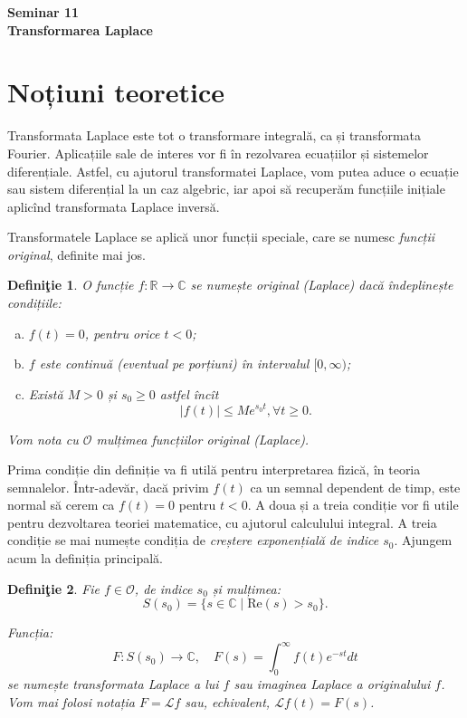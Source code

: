 \documentclass[12pt,a4paper]{article}
\newcommand\kal{\mathcal}
\newcommand\RR{\mathbb{R}}
\newcommand\CC{\mathbb{C}}
\newcommand\Lap{\mathcal{L}}
\theoremstyle{dotless}
\theoremstyle{dotlessdr}
\newtheorem{definition}{Defini\c{t}ie}
\begin{document}

\begin{center}
  {\large\textbf{Seminar 11 \\
      Transformarea Laplace}}
\end{center}

\vspace{2cm}

\section*{Noțiuni teoretice}

\indent\indent Transformata Laplace este tot o transformare integrală, ca și transformata
Fourier. Aplicațiile sale de interes vor fi în rezolvarea ecuațiilor și sistemelor
diferențiale. Astfel, cu ajutorul transformatei Laplace, vom putea aduce o ecuație sau
sistem diferențial la un caz algebric, iar apoi să recuperăm funcțiile inițiale aplicînd
transformata Laplace inversă.

Transformatele Laplace se aplică unor funcții speciale, care se numesc \emph{funcții original},
definite mai jos.

\begin{definition}\label{def:original}
  O funcție $ f : \RR \to \CC $ se numește \emph{original} (Laplace) dacă îndeplinește
  condițiile:
  \begin{enumerate}[(a)]
  \item $ f(t) = 0 $, pentru orice $ t < 0 $;
  \item $ f $ este continuă (eventual pe porțiuni) în intervalul $ [0, \infty) $;
  \item Există $ M > 0 $ și $ s_0 \geq 0 $ astfel încît
    \[
      |f(t)| \leq M e^{s_0t}, \forall t \geq 0.
    \]
  \end{enumerate}

  Vom nota cu $ \kal{O} $ mulțimea funcțiilor original (Laplace).
\end{definition}

Prima condiție din definiție va fi utilă pentru interpretarea fizică, în teoria
semnalelor. Într-adevăr, dacă privim $ f(t) $ ca un semnal dependent de timp, este
normal să cerem ca $ f(t) = 0 $ pentru $ t < 0 $. A doua și a treia condiție vor fi
utile pentru dezvoltarea teoriei matematice, cu ajutorul calculului integral. A treia
condiție se mai numește condiția de \emph{creștere exponențială de indice $ s_0 $}.
Ajungem acum la definiția principală.

\begin{definition}\label{def:transf-lap}
  Fie $ f \in \kal{O} $, de indice $ s_0 $ și mulțimea:
  \[
    S(s_0) = \{ s \in \CC \mid \mathrm{Re}(s) > s_0 \}.
  \]

  Funcția:
  \[
    F : S(s_0) \to \CC, \quad F(s) = \int_0^\infty f(t) e^{-st} dt
  \]
  se numește \emph{transformata Laplace} a lui $ f $ sau \emph{imaginea Laplace} a
  originalului $ f $. Vom mai folosi notația $ F = \Lap f $ sau, echivalent,
  $ \Lap f(t) = F(s) $.
\end{definition}
\end{document}
